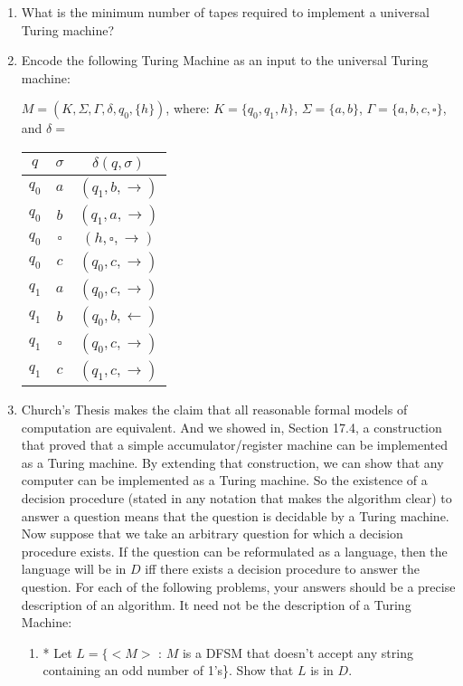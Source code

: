 \documentclass[10pt]{article}
\begin{document}
\begin{enumerate}[1)]

\item
What is the minimum number of tapes required to implement a universal Turing machine?


\item
Encode the following Turing Machine as an input to the universal Turing machine:
\begin{center}
$M = (K, \Sigma, \Gamma, \delta, q_0, \{h\})$, where:   $K = \{q_0, q_1, h\}$,  $\Sigma = \{a, b\}$,  $\Gamma = \{a, b, c, \square\}$, and $\delta =$\\
\vspace{.5cm}
\begin{tabular}{|c|c|c|}
\hline
$q$&$\sigma$&$\delta(q, \sigma)$\\ \hline
$q_0$&$a$&$(q_1, b, \rightarrow)$\\ \hline
$q_0$&$b$&$(q_1, a, \rightarrow)$\\ \hline
$q_0$&$\square$&$(h, \square, \rightarrow)$\\ \hline
$q_0$&$c$&$(q_0, c, \rightarrow)$\\ \hline
$q_1$&$a$&$(q_0, c, \rightarrow)$\\ \hline
$q_1$&$b$&$(q_0, b, \leftarrow)$\\ \hline
$q_1$&$\square$&$(q_0, c, \rightarrow)$\\ \hline
$q_1$&$c$&$(q_1, c, \rightarrow)$\\
\hline
\end{tabular}
\end{center}


\item
Church’s Thesis makes the claim that all reasonable formal models of computation are equivalent.  And we showed in, Section 17.4, a construction that proved that a simple accumulator/register machine can be implemented as a Turing machine.  By extending that construction, we can show that any computer can be implemented as a Turing machine.  So the existence of a decision procedure (stated in any notation that makes the algorithm clear) to answer a question means that the question is decidable by a Turing machine.  Now suppose that we take an arbitrary question for which a decision procedure exists.  If the question can be reformulated as a language, then the language will be in $D$ iff there exists a decision procedure to answer the question.  For each of the following problems, your answers should be a precise description of an algorithm.  It need not be the description of a Turing Machine:
\begin{enumerate}
\item
* Let $L = \{<M>$ : $M$ is a DFSM that doesn’t accept any string containing an odd number of 1’s\}.  Show that 
$L$ is in $D$.


\end{enumerate}
\end{enumerate}
\end{document}

